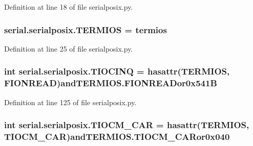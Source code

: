 Definition at line 18 of file serialposix.\+py.

\subsubsection[{\texorpdfstring{T\+E\+R\+M\+I\+OS}{TERMIOS}}]{\setlength{\rightskip}{0pt plus 5cm}serial.\+serialposix.\+T\+E\+R\+M\+I\+OS = termios}\hypertarget{namespaceserial_1_1serialposix_ad56e7a51b0acdb47ce56707e4b7560b8}{}\label{namespaceserial_1_1serialposix_ad56e7a51b0acdb47ce56707e4b7560b8}


Definition at line 25 of file serialposix.\+py.

\subsubsection[{\texorpdfstring{T\+I\+O\+C\+I\+NQ}{TIOCINQ}}]{\setlength{\rightskip}{0pt plus 5cm}int serial.\+serialposix.\+T\+I\+O\+C\+I\+NQ = hasattr({\bf T\+E\+R\+M\+I\+OS}, \textquotesingle{}F\+I\+O\+N\+R\+E\+AD\textquotesingle{})and\+T\+E\+R\+M\+I\+O\+S.\+F\+I\+O\+N\+R\+E\+A\+Dor0x541B}\hypertarget{namespaceserial_1_1serialposix_a0e101a9083b270263a12c1f446ee36bf}{}\label{namespaceserial_1_1serialposix_a0e101a9083b270263a12c1f446ee36bf}


Definition at line 125 of file serialposix.\+py.

\subsubsection[{\texorpdfstring{T\+I\+O\+C\+M\+\_\+\+C\+AR}{TIOCM_CAR}}]{\setlength{\rightskip}{0pt plus 5cm}int serial.\+serialposix.\+T\+I\+O\+C\+M\+\_\+\+C\+AR = hasattr({\bf T\+E\+R\+M\+I\+OS}, \textquotesingle{}T\+I\+O\+C\+M\+\_\+\+C\+AR\textquotesingle{})and\+T\+E\+R\+M\+I\+O\+S.\+T\+I\+O\+C\+M\+\_\+\+C\+A\+Ror0x040}\hypertarget{namespaceserial_1_1serialposix_a39249ce5d46f12bdd4e54d2da1405d31}{}\label{namespaceserial_1_1serialposix_a39249ce5d46f12bdd4e54d2da1405d31}



